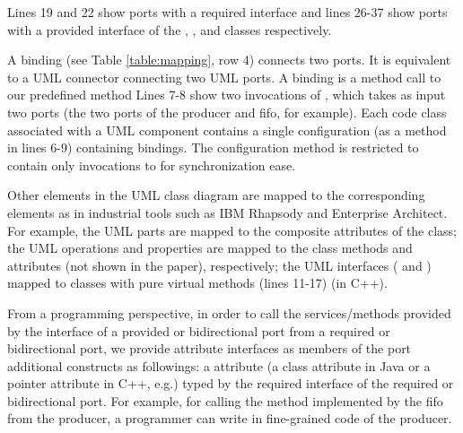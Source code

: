 
Lines 19 and 22 show ports with a required interface and lines 26-37 show ports with a provided interface of the , , and  classes respectively.



\noindent
{}
A binding (see Table \ref{table:mapping}, row 4) connects two ports. 
It is equivalent to a UML connector connecting two UML ports.
A binding is a method call to our predefined method 
Lines 7-8 show two invocations of , which takes as input two ports (the two ports of the producer and fifo, for example).
Each code class associated with a UML component contains a single configuration (as a method in lines 6-9) containing bindings.
The configuration method is restricted to contain only invocations to  for synchronization ease.

Other elements in the UML class diagram are mapped to the corresponding elements as in industrial tools such as IBM Rhapsody and Enterprise Architect.
For example, the  UML parts are mapped to the composite attributes of the  class; the UML operations and properties are mapped to the class methods and attributes (not shown in the paper), respectively; the UML interfaces ( and ) mapped to classes with pure virtual methods (lines 11-17) (in C++). 

From a programming perspective, in order to call the services/methods provided by the interface of a provided or bidirectional port from a required or bidirectional port, we provide attribute interfaces as members of the port additional constructs as followings: a  attribute (a class attribute in Java or a pointer attribute in C++, e.g.) typed by the required interface of the required or bidirectional port. 
For example, for calling the  method implemented by the fifo from the producer, a programmer can write  in fine-grained code of the producer.
 
